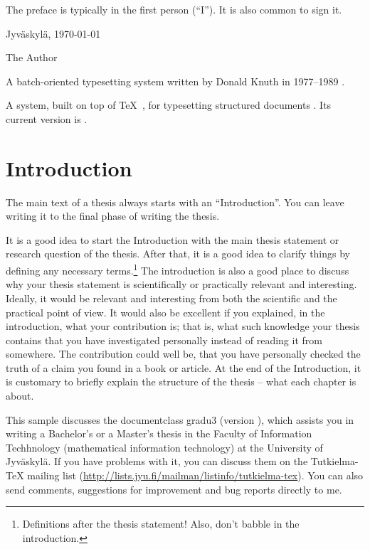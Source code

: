 \documentclass[utf8,english]{gradu3}
\begin{document}
The preface is typically in the first person (``I'').  It is also common
to sign it.

Jyväskylä, \today

\bigskip

The Author

\begin{thetermlist}
\item[\TeX] A batch-oriented typesetting system written by 
Donald Knuth in 1977--1989 \parencite[see][]{knuth86:_texbook}. 
\item[\LaTeX] A system, built on top of \TeX\
  \parencite{knuth86:_texbook}, for typesetting structured
  documents \parencite[see][]{lamport94:_latex}.  Its current version
  is \LaTeXe.
\end{thetermlist}

\mainmatter

\chapter{Introduction}

The main text of a thesis always starts with an ``Introduction''.
You can leave writing it to the final phase of writing the thesis.

It is a good idea to start the Introduction with the main thesis
statement or research question of the thesis.  After that, it is a
good idea to clarify things by defining any necessary
terms.\footnote{Definitions after the thesis statement!  Also, don't
  babble in the introduction.}  The introduction is also a good place
to discuss why your thesis statement is scientifically or practically
relevant and interesting.  Ideally, it would be relevant and
interesting from both the scientific and the practical point of view.
It would also be excellent if you explained, in the introduction, what
your contribution is; that is, what such knowledge your thesis
contains that you have investigated personally instead of reading it
from somewhere.  The contribution could well be, that you have
personally checked the truth of a claim you found in a book or
article.  At the end of the Introduction, it is customary to briefly
explain the structure of the thesis -- what each chapter is about.

This sample discusses the documentclass gradu3 (version
\graduclsversion), which assists you in writing a Bachelor's or a
Master's thesis in the Faculty of Information Techhnology
(mathematical information technology) at the University of Jyväskylä.
If you have problems with it, you can discuss them on the
Tutkielma-TeX mailing list
(\url{http://lists.jyu.fi/mailman/listinfo/tutkielma-tex}).  You can
also send comments, suggestions for improvement and bug reports
directly to me.
\end{document}
